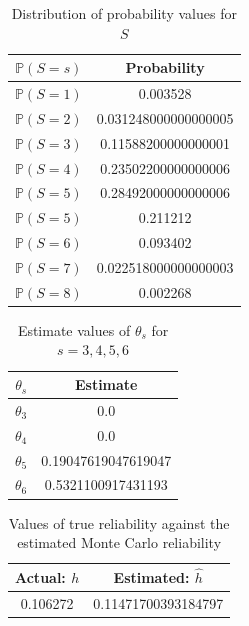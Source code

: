 \documentclass[12pt,
               a4paper,
               article,
               oneside,
               english,oldfontcommands]{memoir}
\begin{document}
\begin{table}[H] 
  \begin{center} 
    \label{tab:con mont}
    \begin{tabular}{c c} 
       $\mathbb{P}(S = s)$ & Probability\\
      \hline
     $\mathbb{P}(S = 1)$ & 0.003528\\
	 $\mathbb{P}(S = 2)$ & 0.031248000000000005\\
	 $\mathbb{P}(S = 3)$  & 0.11588200000000001\\
	 $\mathbb{P}(S = 4)$& 0.23502200000000006\\
	 $\mathbb{P}(S = 5)$& 0.28492000000000006\\
	 $\mathbb{P}(S = 5)$ & 0.211212\\
	 $\mathbb{P}(S = 6)$ & 0.093402\\
	 $\mathbb{P}(S = 7)$ &0.022518000000000003\\
	 $\mathbb{P}(S = 8)$ & 0.002268 \\
      \hline 
    \end{tabular}
     \caption{Distribution of probability values for $S$}
  \end{center}
\end{table}
\begin{table}[H] 
  \begin{center} 
    \label{tab:theta_1}
    \begin{tabular}{c c} 
       $\theta_s$ & Estimate\\
      \hline
$\theta_3$ & 0.0\\
$\theta_4 $ & 0.0\\
$\theta_5$ & 0.19047619047619047\\
$\theta_6$ & 0.5321100917431193\\
      \hline 
    \end{tabular}
     \caption{Estimate values of $\theta_s$ for  $s = 3, 4, 5, 6$}
  \end{center}
\end{table}
\begin{table}[H] 
  \begin{center} 
    \label{tab:con mont rel}
    \begin{tabular}{c c} 
      \textbf{Actual:} $h$ & \textbf{Estimated}: $\hat{h}$ \\
      \hline
      0.106272 &  0.11471700393184797\\
      \hline 
    \end{tabular}
     \caption{Values of true reliability against the estimated Monte Carlo reliability}
  \end{center}
\end{table}
\end{document}
